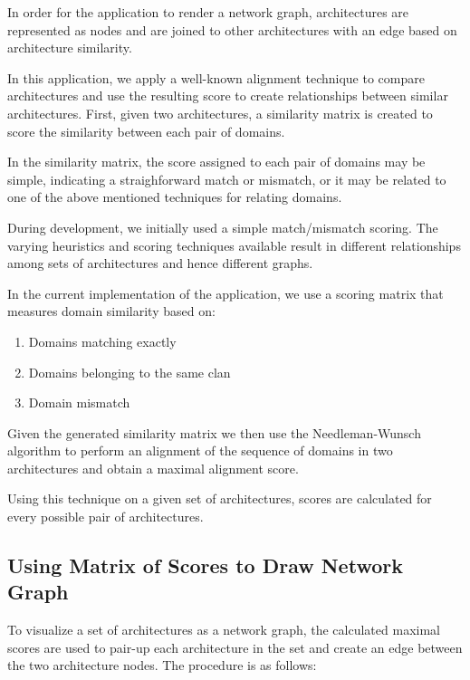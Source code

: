In order for the application to render a network graph, architectures are represented as nodes and are joined to other architectures with an edge based on architecture similarity.

In this application, we apply a well-known alignment technique to compare architectures and use the resulting score to create relationships between similar architectures. First, given two architectures, a similarity matrix is created to score the similarity between each pair of domains. 

In the similarity matrix, the score assigned to each pair of domains may be simple, indicating a straighforward match or mismatch, or it may be related to one of the above mentioned techniques for relating domains.

During development, we initially used a simple match/mismatch scoring. The varying heuristics and scoring techniques available result in different relationships among sets of architectures and hence different graphs.

In the current implementation of the application, we use a scoring matrix that measures domain similarity based on:
\begin{enumerate}
	\item Domains matching exactly
	\item Domains belonging to the same clan
	\item Domain mismatch
\end{enumerate}

Given the generated similarity matrix we then use the Needleman-Wunsch algorithm \cite{nwalgo} to perform an alignment of the sequence of domains in two architectures and obtain a maximal alignment score.

Using this technique on a given set of architectures, scores are calculated for every possible pair of architectures.


\subsection{Using Matrix of Scores to Draw Network Graph}

To visualize a set of architectures as a network graph, the calculated maximal scores are used to pair-up each architecture in the set and create an edge between the two architecture nodes. The procedure is as follows:

